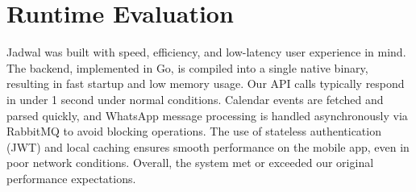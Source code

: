 \section{Runtime Evaluation}

Jadwal was built with speed, efficiency, and low-latency user experience in mind. The backend, implemented in Go, is compiled into a single native binary, resulting in fast startup and low memory usage. Our API calls typically respond in under 1 second under normal conditions. Calendar events are fetched and parsed quickly, and WhatsApp message processing is handled asynchronously via RabbitMQ to avoid blocking operations. The use of stateless authentication (JWT) and local caching ensures smooth performance on the mobile app, even in poor network conditions. Overall, the system met or exceeded our original performance expectations.
